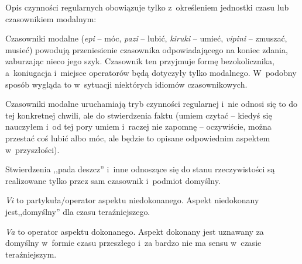 \begin{spacing}{1.1}

Opis czynności regularnych obowiązuje tylko z~określeniem jednostki czasu lub
czasownikiem modalnym:




Czasowniki modalne (\emph{epi} -- móc, \emph{pazi} -- lubić, \emph{kiruki} --
umieć, \emph{vipini} -- zmuszać, musieć) powodują przeniesienie czasownika
odpowiadającego na koniec zdania, zaburzając nieco jego szyk. Czasownik ten
przyjmuje formę bezokolicznika, a~koniugacja i~miejsce operatorów będą dotyczyły
tylko modalnego. W~podobny sposób wygląda to w~sytuacji niektórych idiomów
czasownikowych.



Czasowniki modalne uruchamiają tryb czynności regularnej i~nie odnosi się to do
tej konkretnej chwili, ale do stwierdzenia faktu (umiem czytać -- kiedyś się
nauczyłem i~od tej pory umiem i~raczej nie zapomnę -- oczywiście, można przestać
coś lubić albo móc, ale będzie to opisane odpowiednim aspektem w~przyszłości).

Stwierdzenia ,,pada deszcz'' i~inne odnoszące się do stanu rzeczywistości są
realizowane tylko przez sam czasownik i~podmiot domyślny.



\emph{Vi} to partykuła/operator aspektu niedokonanego. Aspekt niedokonany
jest,,domyślny'' dla czasu teraźniejszego.




\emph{Va} to operator aspektu dokonanego. Aspekt dokonany jest uznawany za
domyślny w~formie czasu przeszłego i~za bardzo nie ma sensu w~czasie
teraźniejszym.



\end{spacing}

